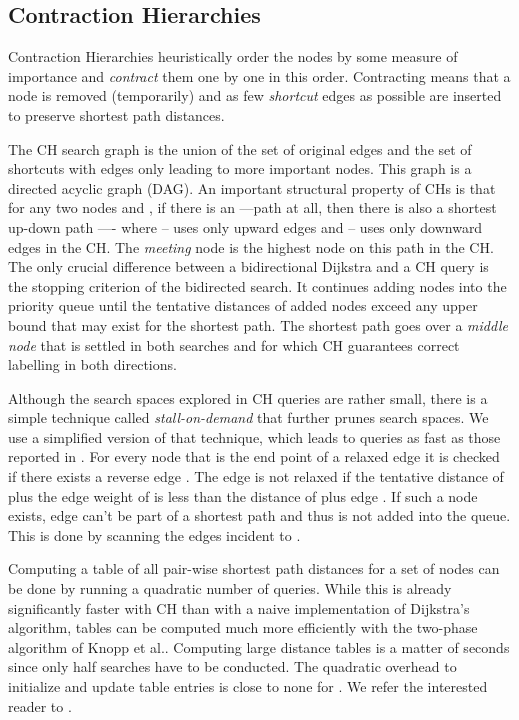 \documentclass{llncs}
\newcommand{\etal}{et al.\xspace}
\newcommand{\ch}{Contraction Hierarchies\xspace}
\begin{document}
\subsection{Contraction Hierarchies}\label{sec:tnr-ch}
\ch heuristically order the nodes by some measure of importance and \emph{contract} them one by one in this order.
Contracting means that a node is removed (temporarily) and as few \emph{shortcut} edges as possible are inserted to preserve shortest path distances.

The CH search graph is the union of the set of original edges and the set of shortcuts with edges only leading to more important nodes.
This graph is a directed acyclic graph (DAG).
An important structural property of CHs is that for any two nodes  and , if there is an ---path at all, then there is also a shortest up-down path ---- where -- uses only upward edges and -- uses only downward edges in the CH. The \emph{meeting} node  is the highest node on this path in the CH.
The only crucial difference between a bidirectional Dijkstra and a CH query is the stopping criterion of the bidirected search.
It continues adding nodes into the priority queue until the tentative distances of added nodes exceed any upper bound that may exist for the shortest path.
The shortest path goes over a \emph{middle node} that is settled in both searches and for which CH guarantees correct labelling in both directions.

Although the search spaces explored in CH queries are rather small, there is a simple technique called \emph{stall-on-demand} \cite{s-rprn-08} that further prunes search spaces.
We use a simplified version of that technique, which leads to queries as fast as those reported in \cite{v-femno-10}.
For every node  that is the end point of a relaxed edge  it is checked if there exists a reverse edge .
The edge is not relaxed if the tentative distance of  plus the edge weight of  is less than the distance of  plus edge .
If such a node  exists, edge  can't be part of a shortest path and thus  is not added into the queue.
This is done by scanning the edges incident to .

Computing a table of all pair-wise shortest path distances for a set of nodes can be done by running a quadratic number of queries.
While this is already significantly faster with CH than with a naive implementation of Dijkstra's algorithm, tables can be computed much more efficiently with the two-phase algorithm of Knopp \etal \cite{ksssw-cmmsp-07}.
Computing large distance tables is a matter of seconds since only  half searches have to be conducted.
The quadratic overhead to initialize and update table entries is close to none for .
We refer the interested reader to \cite{ksssw-cmmsp-07,gssv-erlrn-12}.
\end{document}
